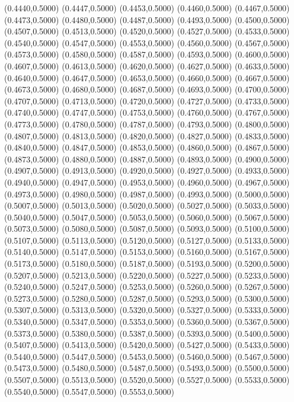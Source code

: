 {(0.4440,0.5000) (0.4447,0.5000) (0.4453,0.5000) (0.4460,0.5000) (0.4467,0.5000) (0.4473,0.5000)
(0.4480,0.5000) (0.4487,0.5000) (0.4493,0.5000) (0.4500,0.5000) (0.4507,0.5000) (0.4513,0.5000)
(0.4520,0.5000) (0.4527,0.5000) (0.4533,0.5000) (0.4540,0.5000) (0.4547,0.5000) (0.4553,0.5000)
(0.4560,0.5000) (0.4567,0.5000) (0.4573,0.5000) (0.4580,0.5000) (0.4587,0.5000) (0.4593,0.5000)
(0.4600,0.5000) (0.4607,0.5000) (0.4613,0.5000) (0.4620,0.5000) (0.4627,0.5000) (0.4633,0.5000)
(0.4640,0.5000) (0.4647,0.5000) (0.4653,0.5000) (0.4660,0.5000) (0.4667,0.5000) (0.4673,0.5000)
(0.4680,0.5000) (0.4687,0.5000) (0.4693,0.5000) (0.4700,0.5000) (0.4707,0.5000) (0.4713,0.5000)
(0.4720,0.5000) (0.4727,0.5000) (0.4733,0.5000) (0.4740,0.5000) (0.4747,0.5000) (0.4753,0.5000)
(0.4760,0.5000) (0.4767,0.5000) (0.4773,0.5000) (0.4780,0.5000) (0.4787,0.5000) (0.4793,0.5000)
(0.4800,0.5000) (0.4807,0.5000) (0.4813,0.5000) (0.4820,0.5000) (0.4827,0.5000) (0.4833,0.5000)
(0.4840,0.5000) (0.4847,0.5000) (0.4853,0.5000) (0.4860,0.5000) (0.4867,0.5000) (0.4873,0.5000)
(0.4880,0.5000) (0.4887,0.5000) (0.4893,0.5000) (0.4900,0.5000) (0.4907,0.5000) (0.4913,0.5000)
(0.4920,0.5000) (0.4927,0.5000) (0.4933,0.5000) (0.4940,0.5000) (0.4947,0.5000) (0.4953,0.5000)
(0.4960,0.5000) (0.4967,0.5000) (0.4973,0.5000) (0.4980,0.5000) (0.4987,0.5000) (0.4993,0.5000)
(0.5000,0.5000) (0.5007,0.5000) (0.5013,0.5000) (0.5020,0.5000) (0.5027,0.5000) (0.5033,0.5000)
(0.5040,0.5000) (0.5047,0.5000) (0.5053,0.5000) (0.5060,0.5000) (0.5067,0.5000) (0.5073,0.5000)
(0.5080,0.5000) (0.5087,0.5000) (0.5093,0.5000) (0.5100,0.5000) (0.5107,0.5000) (0.5113,0.5000)
(0.5120,0.5000) (0.5127,0.5000) (0.5133,0.5000) (0.5140,0.5000) (0.5147,0.5000) (0.5153,0.5000)
(0.5160,0.5000) (0.5167,0.5000) (0.5173,0.5000) (0.5180,0.5000) (0.5187,0.5000) (0.5193,0.5000)
(0.5200,0.5000) (0.5207,0.5000) (0.5213,0.5000) (0.5220,0.5000) (0.5227,0.5000) (0.5233,0.5000)
(0.5240,0.5000) (0.5247,0.5000) (0.5253,0.5000) (0.5260,0.5000) (0.5267,0.5000) (0.5273,0.5000)
(0.5280,0.5000) (0.5287,0.5000) (0.5293,0.5000) (0.5300,0.5000) (0.5307,0.5000) (0.5313,0.5000)
(0.5320,0.5000) (0.5327,0.5000) (0.5333,0.5000) (0.5340,0.5000) (0.5347,0.5000) (0.5353,0.5000)
(0.5360,0.5000) (0.5367,0.5000) (0.5373,0.5000) (0.5380,0.5000) (0.5387,0.5000) (0.5393,0.5000)
(0.5400,0.5000) (0.5407,0.5000) (0.5413,0.5000) (0.5420,0.5000) (0.5427,0.5000) (0.5433,0.5000)
(0.5440,0.5000) (0.5447,0.5000) (0.5453,0.5000) (0.5460,0.5000) (0.5467,0.5000) (0.5473,0.5000)
(0.5480,0.5000) (0.5487,0.5000) (0.5493,0.5000) (0.5500,0.5000) (0.5507,0.5000) (0.5513,0.5000)
(0.5520,0.5000) (0.5527,0.5000) (0.5533,0.5000) (0.5540,0.5000) (0.5547,0.5000) (0.5553,0.5000)
}
